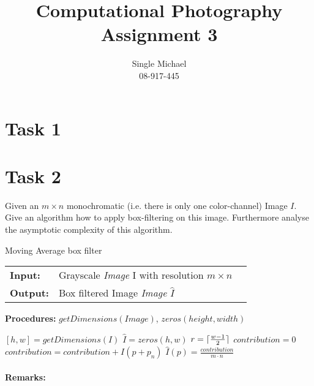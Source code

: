 \documentclass{paper}
\title{Computational Photography Assignment 3}
\author{Single Michael\\08-917-445}
\DeclarePairedDelimiter\ceil{\lceil}{\rceil}
\begin{document}
\maketitle


\section*{Task 1}
    
\section*{Task 2}

Given an $m \times n$ monochromatic (i.e. there is only one color-channel) Image $I$. 
Give an algorithm how to apply box-filtering on this image. Furthermore analyse the asymptotic complexity of this algorithm.

\begin{algorithm}[H]
\caption{Moving Average box filter}
\begin{table}[H]
  \begin{tabular}{@{}lll@{}}
    \textbf{Input:} & Grayscale \emph{Image} I with resolution $m \times n$  \\
    \textbf{Output:} & Box filtered Image \emph{Image} $\hat{I}$   \\
  \end{tabular} 
\end{table}
\textbf{Procedures:} $getDimensions(Image)$, $zeros(height, width)$  \\
\setlength{\fboxrule}{0pt} 
\begin{boxedminipage}{1.0\textwidth}
  \begin{algorithmic}[1]
      \State $ [h,w] = getDimensions(I)$
      \State $ \hat{I} = zeros(h,w)$
      \State $ r = \ceil{\frac{w-1}{2}}$
        \State $ contribution = 0$
            \State $ contribution = contribution + I(p+p_n)$
        \EndFor
        \State $ \hat{I}(p) = \frac{contribution}{m \cdot n}$
      \EndFor
  \end{algorithmic}
  \end{boxedminipage}
  \vskip1.5pt
\label{alg:boxfilter}
\end{algorithm}

\paragraph{Remarks:}
\end{document}

